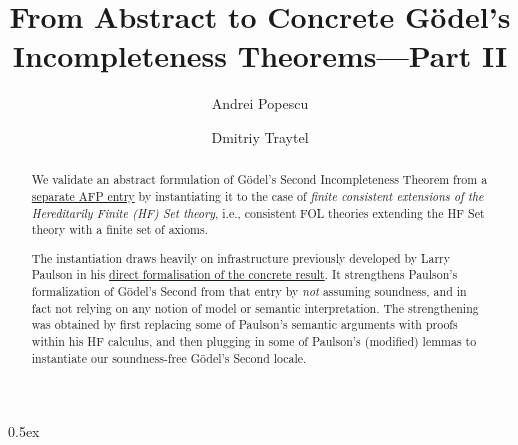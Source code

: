 \documentclass[10pt,a4paper]{report}
\begin{document}
\title{From Abstract to Concrete G\"odel's Incompleteness Theorems---Part II}
\author{Andrei Popescu \and Dmitriy Traytel}

\maketitle

\begin{abstract} We validate an abstract formulation of G\"odel’s Second Incompleteness Theorem from a
\href{https://www.isa-afp.org/entries/Goedel_Incompleteness.html}{separate AFP entry} by instantiating it to
the case of \emph{finite consistent extensions of the Hereditarily Finite (HF) Set theory}, i.e., consistent
FOL theories extending the HF Set theory with a finite set of axioms.

The instantiation draws heavily on infrastructure previously developed by Larry Paulson in his
\href{https://www.isa-afp.org/entries/Incompleteness.html}{direct formalisation of the concrete result}. It
strengthens Paulson’s formalization of G\"odel's Second from that entry by \emph{not} assuming soundness, and
in fact not relying on any notion of model or semantic interpretation. The strengthening was obtained by
first replacing some of Paulson’s semantic arguments with proofs within his HF calculus, and then plugging in
some of Paulson's (modified) lemmas to instantiate our soundness-free G\"odel's Second locale.
\end{abstract}

\tableofcontents

\parindent 0pt\parskip 0.5ex




\end{document}

